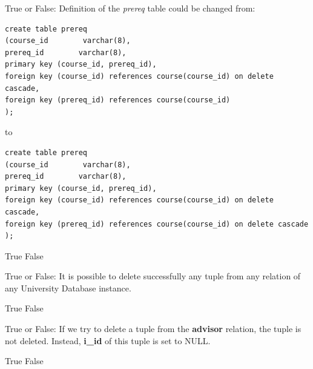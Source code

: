 \documentclass[12pt]{exam}
\begin{document}
\begin{questions}
\begin{minipage}{\linewidth}
\question[2]
True or False: Definition of the \textit{prereq} table could be changed from: \par\vspace{0.5em}
\begin{verbatim}
create table prereq
(course_id        varchar(8), 
prereq_id        varchar(8),
primary key (course_id, prereq_id),
foreign key (course_id) references course(course_id) on delete cascade,
foreign key (prereq_id) references course(course_id)
);
\end{verbatim}
to\par\vspace{0.5em}
\begin{verbatim}
create table prereq
(course_id        varchar(8), 
prereq_id        varchar(8),
primary key (course_id, prereq_id),
foreign key (course_id) references course(course_id) on delete cascade,
foreign key (prereq_id) references course(course_id) on delete cascade
);
\end{verbatim}
\begin{checkboxes}
    \CorrectChoice True
    \choice False
\end{checkboxes}
\end{minipage}\vspace{1em}

\begin{minipage}{\linewidth}
\question[2]
True or False: It is possible to delete successfully any tuple from any relation of any University Database instance.\par\vspace{0.5em}
\begin{checkboxes}
    \choice True
    \CorrectChoice False
\end{checkboxes}
\end{minipage}\vspace{1em}

\begin{minipage}{\linewidth}
\question[2]
True or False: If we try to delete a tuple from the \textbf{advisor} relation, the tuple is not deleted. 
Instead, \textbf{i\_id} of this tuple is set to NULL.\par\vspace{0.5em}
\begin{checkboxes}
    \choice True
    \CorrectChoice False
\end{checkboxes}
\end{minipage}\vspace{1em}


\end{questions}
\end{document}
